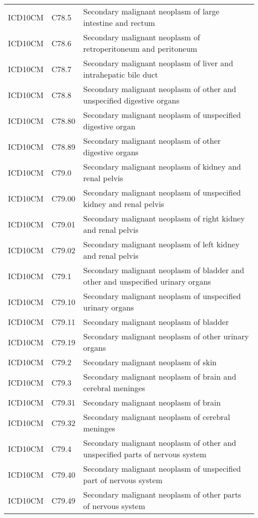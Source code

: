 \begin{table}[ht]
\begin{tabular}{lll}
  ICD10CM & C78.5 & Secondary malignant neoplasm of large intestine and rectum \\ 
  ICD10CM & C78.6 & Secondary malignant neoplasm of retroperitoneum and peritoneum \\ 
  ICD10CM & C78.7 & Secondary malignant neoplasm of liver and intrahepatic bile duct \\ 
  ICD10CM & C78.8 & Secondary malignant neoplasm of other and unspecified digestive organs \\ 
  ICD10CM & C78.80 & Secondary malignant neoplasm of unspecified digestive organ \\ 
  ICD10CM & C78.89 & Secondary malignant neoplasm of other digestive organs \\ 
  ICD10CM & C79.0 & Secondary malignant neoplasm of kidney and renal pelvis \\ 
  ICD10CM & C79.00 & Secondary malignant neoplasm of unspecified kidney and renal pelvis \\ 
  ICD10CM & C79.01 & Secondary malignant neoplasm of right kidney and renal pelvis \\ 
  ICD10CM & C79.02 & Secondary malignant neoplasm of left kidney and renal pelvis \\ 
  ICD10CM & C79.1 & Secondary malignant neoplasm of bladder and other and unspecified urinary organs \\ 
  ICD10CM & C79.10 & Secondary malignant neoplasm of unspecified urinary organs \\ 
  ICD10CM & C79.11 & Secondary malignant neoplasm of bladder \\ 
  ICD10CM & C79.19 & Secondary malignant neoplasm of other urinary organs \\ 
  ICD10CM & C79.2 & Secondary malignant neoplasm of skin \\ 
  ICD10CM & C79.3 & Secondary malignant neoplasm of brain and cerebral meninges \\ 
  ICD10CM & C79.31 & Secondary malignant neoplasm of brain \\ 
  ICD10CM & C79.32 & Secondary malignant neoplasm of cerebral meninges \\ 
  ICD10CM & C79.4 & Secondary malignant neoplasm of other and unspecified parts of nervous system \\ 
  ICD10CM & C79.40 & Secondary malignant neoplasm of unspecified part of nervous system \\ 
  ICD10CM & C79.49 & Secondary malignant neoplasm of other parts of nervous system \\ 

\end{tabular}
\end{table}
